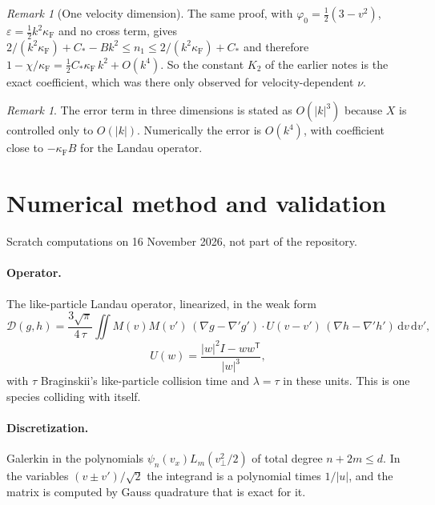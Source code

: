 \documentclass[11pt]{article}
\newcommand{\dd}{\mathrm{d}}
\newcommand{\cD}{\mathcal{D}}
\theoremstyle{remark}
\newtheorem{remark}[theorem]{Remark}
\begin{document}
\begin{remark}[One velocity dimension]
The same proof, with $\varphi_0=\tfrac12(3-v^2)$,
$\varepsilon=\tfrac12k^2\kappa_{\mathrm F}$ and no cross term, gives
$2/(k^2\kappa_{\mathrm F})+C_*-Bk^2\le n_1\le2/(k^2\kappa_{\mathrm F})+C_*$
and therefore
$1-\chi/\kappa_{\mathrm F}=\tfrac12C_*\kappa_{\mathrm F}\,k^2+O(k^4)$. So the
constant $K_2$ of the earlier notes is the exact coefficient, which was
there only observed for velocity-dependent $\nu$.
\end{remark}

\begin{remark}
The error term in three dimensions is stated as $O(|k|^3)$ because $X$ is
controlled only to $O(|k|)$. Numerically the error is $O(k^4)$, with
coefficient close to $-\kappa_{\mathrm F}B$ for the Landau operator.
\end{remark}

\section{Numerical method and validation}
\label{sec:num}

Scratch computations on 16 November 2026, not part of the repository.

\paragraph{Operator.} The like-particle Landau operator, linearized, in the
weak form
\[
  \cD(g,h)=\frac{3\sqrt\pi}{4\,\tau}\iint M(v)M(v')\,
  (\nabla g-\nabla'g')\cdot U(v-v')\,(\nabla h-\nabla'h')\,\dd v\,\dd v',
\]
\[
  U(w)=\frac{|w|^2I-ww^{\mathsf T}}{|w|^3},
\]
with $\tau$ Braginskii's like-particle collision time and $\lambda=\tau$ in
these units. This is one species colliding with itself.

\paragraph{Discretization.} Galerkin in the polynomials
$\psi_n(v_x)L_m(v_\perp^2/2)$ of total degree $n+2m\le d$. In the variables
$(v\pm v')/\sqrt2$ the integrand is a polynomial times $1/|u|$, and the
matrix is computed by Gauss quadrature that is exact for it.
\end{document}
